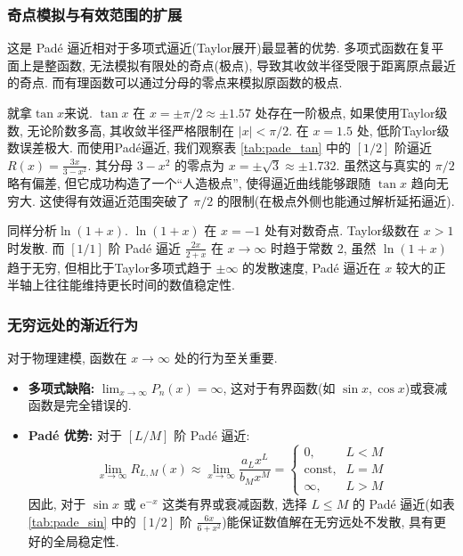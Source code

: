 \documentclass[UTF8, a4paper, 11pt]{ctexart}
\begin{document}
\subsubsection{奇点模拟与有效范围的扩展}
这是 Padé 逼近相对于多项式逼近(Taylor展开)最显著的优势. 多项式函数在复平面上是整函数, 无法模拟有限处的奇点(极点), 导致其收敛半径受限于距离原点最近的奇点. 而有理函数可以通过分母的零点来模拟原函数的极点. 

就拿$\tan x$来说. $\tan x$ 在 $x = \pm \pi/2 \approx \pm 1.57$ 处存在一阶极点, 如果使用Taylor级数, 无论阶数多高, 其收敛半径严格限制在 $|x| < \pi/2$. 在 $x=1.5$ 处, 低阶Taylor级数误差极大. 而使用Padé逼近, 我们观察表 \ref{tab:pade_tan} 中的 $[1/2]$ 阶逼近 $R(x) = \frac{3x}{3-x^2}$. 其分母 $3-x^2$ 的零点为 $x = \pm \sqrt{3} \approx \pm 1.732$. 虽然这与真实的 $\pi/2$ 略有偏差, 但它成功构造了一个“人造极点”, 使得逼近曲线能够跟随 $\tan x$ 趋向无穷大. 这使得有效逼近范围突破了 $\pi/2$ 的限制(在极点外侧也能通过解析延拓逼近).

同样分析$\ln(1+x)$. $\ln(1+x)$ 在 $x=-1$ 处有对数奇点. Taylor级数在 $x > 1$ 时发散. 而 $[1/1]$ 阶 Padé 逼近 $\frac{2x}{2+x}$ 在 $x \to \infty$ 时趋于常数 2, 虽然 $\ln(1+x)$ 趋于无穷, 但相比于Taylor多项式趋于 $\pm \infty$ 的发散速度, Padé 逼近在 $x$ 较大的正半轴上往往能维持更长时间的数值稳定性. 

\subsubsection{无穷远处的渐近行为}
对于物理建模, 函数在 $x \to \infty$ 处的行为至关重要. 
\begin{itemize}
    \item \textbf{多项式缺陷: } $\lim_{x\to\infty} P_n(x) = \infty$, 这对于有界函数(如 $\sin x, \cos x$)或衰减函数是完全错误的. 
    \item \textbf{Padé 优势: } 对于 $[L/M]$ 阶 Padé 逼近: 
    \begin{equation}
        \lim_{x\to\infty} R_{L,M}(x) \approx \lim_{x\to\infty} \frac{a_L x^L}{b_M x^M} = \begin{cases} 
        0, & L < M \\
        \text{const}, & L = M \\
        \infty, & L > M
        \end{cases}
    \end{equation}
    因此, 对于 $\sin x$ 或 $\mathrm{e}^{-x}$ 这类有界或衰减函数, 选择 $L \le M$ 的 Padé 逼近(如表 \ref{tab:pade_sin} 中的 $[1/2]$ 阶 $\frac{6x}{6+x^2}$)能保证数值解在无穷远处不发散, 具有更好的全局稳定性. 
\end{itemize}
\end{document}

